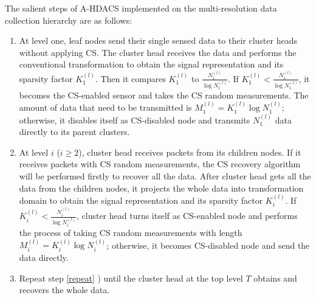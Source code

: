 \documentclass[conference]{IEEEtran}
\begin{document}
The salient steps of A-HDACS implemented on the multi-resolution data collection hierarchy are as follows:
\begin{enumerate}

\item At level one, leaf nodes send their single sensed data to their cluster heads without applying CS. 
The cluster head receives the data and performs the conventional transformation to 
obtain the signal representation and its sparsity factor $K_1^{(l)}$. Then
it compares $K_1^{(l)}$ to $\frac{N_1^{(l)}}{\log{N_1^{(l)}}}$.
If $K_1^{(l)} < \frac{N_1^{(l)}}{\log{N_1^{(l)}}}$, it becomes the CS-enabled sensor and takes the CS random 
measurements. The amount of data that need to be transmitted is $M_1^{(l)}=K_1^{(l)} 
\log{N_1^{(l)}}$; otherwise, it disables itself as 
CS-disabled node and transmits $N_1^{(l)}$ data directly to its parent clusters.

\item At level $i$ ($ i \geq 2$), cluster head receives packets from its children nodes. If 
it receives packets with CS random measurements, the CS recovery algorithm will 
be performed firstly to recover all the data.
After cluster head gets all the data from the children nodes, it projects the 
whole data into transformation domain to obtain the signal representation and its 
sparsity factor $K_i^{(l)}$. If $K_i^{(l)} < \frac{N_i^{(l)}}{\log{N_i^{(l)}}}$, 
cluster head turns itself as CS-enabled node and performs the process of taking 
CS random measurements with length $M_i^{(l)}=K_i^{(l)} \log{N_i^{(l)}}$; 
otherwise, it becomes CS-disabled node and send the data directly. 
\label{repeat}

\item Repeat step \ref{repeat} ) until the cluster head at the top level $T$ obtains 
and recovers the whole data.
\end{enumerate}
\end{document}
